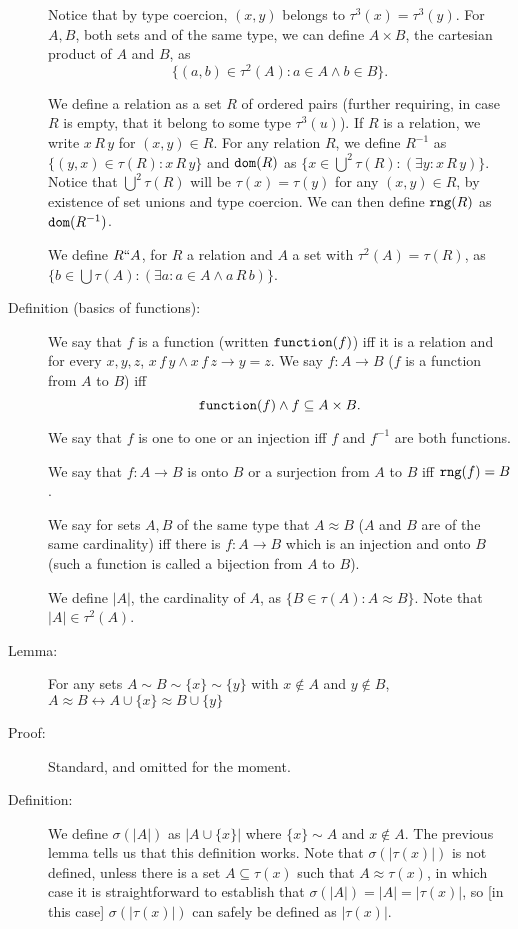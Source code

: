 \documentclass[12pt]{article}
\begin{document}
\begin{description}
Notice that by type coercion, $(x,y)$ belongs
to $\tau^3(x) = \tau^3(y)$.  For $A , B$, both sets and of the same type, we can define $A \times B$, the cartesian product of $A$ and $B$,  as $$\{(a,b)\in \tau^2(A):a \in A \wedge b \in B\}.$$

We define a relation as a set $R$ of ordered pairs (further requiring, in case $R$ is empty, that it belong to some type $\tau^3(u)$).  If $R$ is a relation, we write $x \, R\, y$ for $(x,y) \in R$.  For any relation $R$, we define $R^{-1}$ as \newline $\{(y,x) \in \tau(R):x \, R\, y\}$ and ${\tt dom}(R)$ as $\{x \in \bigcup^2 \tau(R):(\exists y:x \, R\, y)\}$.  Notice that
$\bigcup^2 \tau(R)$ will be $\tau(x) = \tau(y)$ for any $(x,y)\in R$, by existence of set unions and type coercion. We can then define ${\tt rng}(R)$ as ${\tt dom}(R^{-1})$.

We define $R``A$, for $R$ a relation and $A$ a set with $\tau^2(A) = \tau(R)$, as $\{b \in \bigcup \tau(A):(\exists a:a \in A \wedge a \, R \, b)\}$.

\item[Definition (basics of functions):]  We say that $f$ is a function (written ${\tt function}(f)$) iff it is a relation and for every $x,y,z$, $x \,f\,y \wedge x \,f\,z \rightarrow y=z$.  We say $f:A \rightarrow B$ ($f$ is a function from $A$ to $B$) iff $${\tt function}(f) \wedge f \subseteq A \times B.$$  

We say that $f$ is one to one or an injection iff $f$ and $f^{-1}$ are both functions.

We say that $f:A \rightarrow B$ is onto $B$ or a surjection from $A$ to $B$ iff ${\tt rng}(f)=B$.  

We say for sets $A,B$ of the same type that $A \approx B$ ($A$ and $B$ are of the same cardinality) iff there is $f:A \rightarrow B$ which is an injection and onto $B$ (such a function is called a bijection from $A$ to $B$).  

We define $|A|$, the cardinality of $A$,
as $\{B \in \tau(A):A \approx B\}$.  Note that $|A| \in \tau^2(A)$.

\item[Lemma:]  For any sets $A\sim B \sim \{x\} \sim \{y\}$ with $x \not\in A$ and $y \not\in B$, $A \approx B \leftrightarrow A \cup \{x\} \approx B \cup\{y\}$

\item[Proof:]  Standard, and omitted for the moment.

\item[Definition:]  We define $\sigma(|A|)$ as $|A \cup \{x\}|$ where $\{x\} \sim A$ and $x \not\in A$.  The previous lemma tells us that this definition works.  Note that $\sigma(|\tau(x)|)$ is not defined, unless there is a set $A \subseteq \tau(x)$ such that $A \approx \tau(x)$, in which case it is straightforward to establish that $\sigma(|A|) = |A| = |\tau(x)|$, so [in this case] $\sigma(|\tau(x)|)$ can safely be defined as $|\tau(x)|$.


\end{description}
\end{document}
